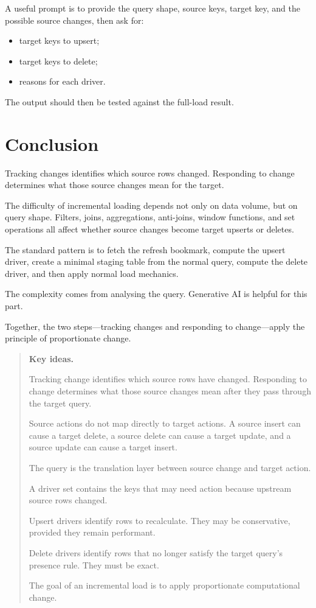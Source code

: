 \documentclass[10pt,openany,10pt]{book}
\providecommand{\tightlist}{%
  \setlength{\itemsep}{0pt}\setlength{\parskip}{0pt}}
\begin{document}
A useful prompt is to provide the query shape, source keys, target key,
and the possible source changes, then ask for:

\begin{itemize}
\tightlist
\item
  target keys to upsert;
\item
  target keys to delete;
\item
  reasons for each driver.
\end{itemize}

The output should then be tested against the full-load result.

\section{Conclusion}\label{conclusion-4}

Tracking changes identifies which source rows changed. Responding to
change determines what those source changes mean for the target.

The difficulty of incremental loading depends not only on data volume,
but on query shape. Filters, joins, aggregations, anti-joins, window
functions, and set operations all affect whether source changes become
target upserts or deletes.

The standard pattern is to fetch the refresh bookmark, compute the
upsert driver, create a minimal staging table from the normal query,
compute the delete driver, and then apply normal load mechanics.

The complexity comes from analysing the query. Generative AI is helpful
for this part.

Together, the two steps---tracking changes and responding to
change---apply the principle of proportionate change.

\begin{quote}
\textbf{Key ideas.}

Tracking change identifies which source rows have changed. Responding to
change determines what those source changes mean after they pass through
the target query.

Source actions do not map directly to target actions. A source insert
can cause a target delete, a source delete can cause a target update,
and a source update can cause a target insert.

The query is the translation layer between source change and target
action.

A driver set contains the keys that may need action because upstream
source rows changed.

Upsert drivers identify rows to recalculate. They may be conservative,
provided they remain performant.

Delete drivers identify rows that no longer satisfy the target query's
presence rule. They must be exact.

The goal of an incremental load is to apply proportionate computational
change.
\end{quote}
\end{document}
